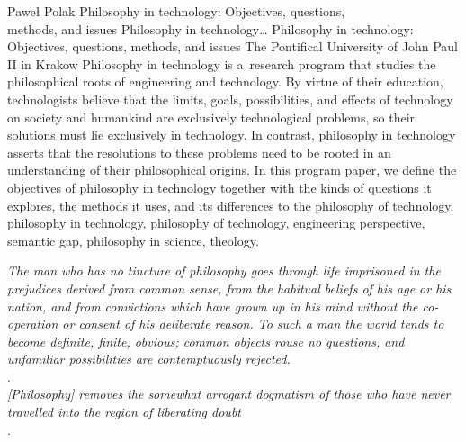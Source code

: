 \begin{artengenv}{Paweł Polak}
	{Philosophy in technology: Objectives, questions,\\methods, and issues}
	{Philosophy in technology\ldots}
	{Philosophy in technology: Objectives, questions, methods, and issues}
	{The Pontifical University of John Paul II in Krakow}
	{Philosophy in technology is a~research program that studies the philosophical roots of engineering and technology. By virtue of their education, technologists believe that the limits, goals, possibilities, and effects of technology on society and humankind are exclusively technological problems, so their solutions must lie exclusively in technology. In contrast, philosophy in technology asserts that the resolutions to these problems need to be rooted in an understanding of their philosophical origins. In this program paper, we define the objectives of philosophy in technology together with the kinds of questions it explores, the methods it uses, and its differences to the philosophy of technology. \enlargethispage{2.5\baselineskip}
	}
	{philosophy in technology, philosophy of technology, engineering perspective, semantic gap, philosophy in science, theology.}


\begin{customepigraph}
\textit{The man who has no tincture of philosophy goes through life imprisoned in the prejudices derived from common sense, from the habitual beliefs of his age or his nation, and from convictions which have grown up in his mind without the co-operation or consent of his deliberate reason. To such a man the world tends to become definite, finite, obvious; common objects rouse no questions, and unfamiliar possibilities are contemptuously rejected.} \\
\parencite[][p.243]{russell_problems_1912}. \\

\noindent\textit{[Philosophy] removes the somewhat arrogant dogmatism of those who have never travelled into the region of liberating doubt} \\
\parencite[][pp.243–244]{russell_problems_1912}. \\
\end{customepigraph}




\end{artengenv}
